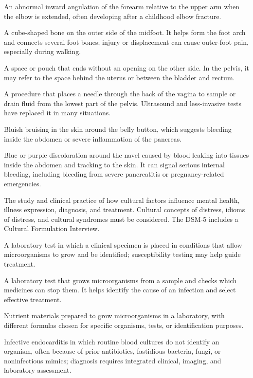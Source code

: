  An abnormal inward angulation of the forearm relative to the upper arm when the elbow is
extended, often developing after a childhood elbow fracture.

 A cube-shaped bone on the outer side of the midfoot. It helps form the foot arch and connects several foot bones; injury or displacement can cause outer-foot pain, especially during walking.

 A space or pouch that ends without an opening on the other side. In the pelvis, it may refer to the space behind the uterus or between the bladder and rectum.

 A procedure that places a needle through the back of the vagina to sample or drain fluid from the lowest part of the pelvis. Ultrasound and less-invasive tests have replaced it in many situations.

 Bluish bruising in the skin around the belly button, which suggests bleeding inside the abdomen or severe inflammation of the pancreas.

 Blue or purple discoloration around the navel caused by blood leaking into tissues inside the abdomen and tracking to the skin. It can signal serious internal bleeding, including bleeding from severe pancreatitis or pregnancy-related emergencies.

 The study and clinical practice of how cultural factors influence mental health, illness
expression, diagnosis, and treatment. Cultural concepts of distress, idioms of distress,
and cultural syndromes must be considered. The DSM-5 includes a Cultural Formulation
Interview.

 A laboratory test in which a clinical specimen is placed in conditions that allow microorganisms to grow and be identified; susceptibility testing may help guide treatment.

 A laboratory test that grows microorganisms from a sample and checks which medicines can stop them. It helps identify the cause of an infection and select effective treatment.

 Nutrient materials prepared to grow microorganisms in a laboratory, with different formulas chosen for specific organisms, tests, or identification purposes.

 Infective endocarditis in which routine blood cultures do not identify an organism, often because of prior antibiotics, fastidious bacteria, fungi, or noninfectious mimics; diagnosis requires integrated clinical, imaging, and laboratory assessment.

